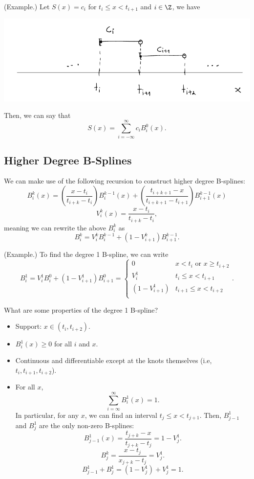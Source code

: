 \documentclass[letterpaper]{article}
\begin{document}
\begin{mdframed}
    (Example.) Let $S(x) = c_i$ for $t_{i} \leq x < t_{i + 1}$ and $i \in \Z$, we have 

    \begin{center}
        \includegraphics[scale=0.5]{../assets/bspline_2.png}
    \end{center}

    Then, we can say that 
    \[S(x) = \sum_{i = -\infty}^{\infty} c_{i} B_{i}^{0}(x).\]
\end{mdframed}

\subsection{Higher Degree B-Splines}
We can make use of the following recursion to construct higher degree B-splines: 
\[B_{i}^{k}(x) = \left(\frac{x - t_i}{t_{i + k} - t_{i}}\right)B_{i}^{k - 1}(x) + \left(\frac{t_{i + k + 1} - x}{t_{i + k + 1} - t_{i + 1}}\right) B_{i + 1}^{k - 1}(x)\]
\[V_{i}^{k}(x) = \frac{x - t_{i}}{t_{i + k} - t_i},\]
meaning we can rewrite the above $B_{i}^{k}$ as
\[B_{i}^{k} = V_{i}^{k} B_{i}^{k - 1} + (1 - V_{i + 1}^{k}) B_{i + 1}^{k - 1}.\]


\begin{mdframed}[nobreak=true]
    (Example.) To find the degree 1 B-spline, we can write 
    \[B_{i}^{1} = V_{i}^{1} B_{i}^{0} + (1 - V_{i + 1}^{1}) B_{i + 1}^{0} = \begin{cases}
        0 & x < t_i \text{ or } x \geq t_{i + 2} \\ 
        V_{i}^{1} & t_i \leq x < t_{i + 1} \\ 
        (1 - V_{i + 1}^{1}) & t_{i + 1} \leq x < t_{i + 2} \\ 
    \end{cases}.\]
\end{mdframed}
What are some properties of the degree 1 B-spline? 
\begin{itemize}
    \item Support: $x \in (t_{i}, t_{i + 2})$.
    \item $B_{i}^{1}(x) \geq 0$ for all $i$ and $x$.
    \item Continuous and differentiable except at the knots themselves (i.e, $t_{i}, t_{i + 1}, t_{i + 2}$).
    \item For all $x$, 
    \[\sum_{i = \infty}^{\infty} B_{i}^{1}(x) = 1.\]
    In particular, for any $x$, we can find an interval $t_{j} \leq x < t_{j + 1}$. Then, $B_{j - 1}^{1}$ and $B_{j}^{1}$ are the only non-zero B-splines:
    \[B_{j - 1}^{1}(x) = \frac{t_{j + k} - x}{t_{j + k} - t_j} = 1 - V_{j}^{1}.\]
    \[B_{j}^{k} = \frac{x - t_j}{x_{j + k} - t_j} = V_{j}^{1}.\]
    \[B_{j - 1}^{1} + B_{j}^{1} = (1 - V_j^{1}) + V_j^1 = 1.\]
\end{itemize}
\end{document}
